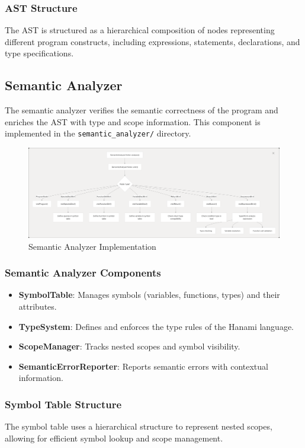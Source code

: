 \documentclass[conference]{IEEEtran}
\begin{document}
\subsubsection{AST Structure}
The AST is structured as a hierarchical composition of nodes representing different program constructs, including expressions, statements, declarations, and type specifications.

\subsection{Semantic Analyzer}
The semantic analyzer verifies the semantic correctness of the program and enriches the AST with type and scope information. This component is implemented in the \texttt{semantic\_analyzer/} directory.
\begin{figure}[H] %
        \centering
        \includegraphics[width=1\linewidth]{seman_imp.png} %
        \caption{Semantic Analyzer Implementation}
        \label{fig:seman_imp} %
    \end{figure}
\subsubsection{Semantic Analyzer Components}
\begin{itemize}
    \item \textbf{SymbolTable}: Manages symbols (variables, functions, types) and their attributes.
    \item \textbf{TypeSystem}: Defines and enforces the type rules of the Hanami language.
    \item \textbf{ScopeManager}: Tracks nested scopes and symbol visibility.
    \item \textbf{SemanticErrorReporter}: Reports semantic errors with contextual information.
\end{itemize}

\subsubsection{Symbol Table Structure}
The symbol table uses a hierarchical structure to represent nested scopes, allowing for efficient symbol lookup and scope management.
\end{document}
